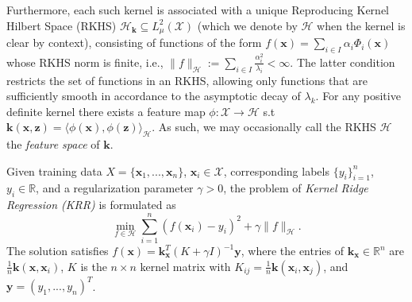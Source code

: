 \documentclass[10pt]{article} %
\theoremstyle{plain}
\theoremstyle{definition}
\theoremstyle{remark}
\newcommand{\Real}{\mathbb{R}}
\newcommand{\x}{\mathbf{x}}
\newcommand{\calx}{\mathcal{X}}
\newcommand{\z}{\mathbf{z}}
\newcommand{\y}{\mathbf{y}}
\newcommand{\kk}{\mathbf{k}}
\newcommand{\hh}{\mathcal{H}}
\newcommand{\kr}{\boldsymbol{k}}
\newcommand{\rb}[1]{\textcolor{magenta}{[Ronen: #1]}}
\begin{document}
Furthermore, each such kernel is associated with a unique Reproducing Kernel Hilbert Space (RKHS) $\hh_{\kr}\subseteq L^2_\mu (\calx)$ (which we denote by $\hh$ when the kernel is clear by context), consisting of functions of the form $f(\x)=\sum_{i \in I} \alpha_i \Phi_i(\x)$ whose RKHS norm is finite, i.e., $\|f\|_\hh:=\sum_{i \in I} \frac{\alpha_i^2}{\lambda_i}<\infty$. The latter condition restricts the set of functions in an RKHS, allowing only functions that are sufficiently smooth in accordance to the asymptotic decay of $\lambda_k$. 
For any positive definite kernel there exists a feature map $\phi:\mathcal{X}\to\hh$ s.t $\kr(\x,\z)=\langle \phi(\x),\phi(\z) \rangle_\hh$. As such, we may occasionally call the RKHS $\hh$ the \emph{feature space} of $\kr$.

Given training data $X=\{\x_1,...,\x_n\}$, $\x_i \in \calx$, corresponding labels  $\{y_i\}_{i=1}^n$, $y_i \in \Real$, and a regularization parameter $\gamma > 0$, the problem of \emph{Kernel Ridge Regression (KRR)} is formulated as
\begin{equation}  \label{eq:regression}
    \min_{f \in \hh}\sum_{i=1}^n(f(\x_i)-y_i)^2+ \gamma\|f\|_\hh.
\end{equation}
The solution satisfies $f(\x)=\kk_\x^T (K+\gamma I)^{-1}\y$, where the entries of $\kk_\x \in \Real^n$ are $\frac{1}{n}\kr(\x,\x_i)$, $K$ is the $n \times n$ kernel matrix with $K_{ij}=\frac{1}{n}\kr(\x_i,\x_j)$, and $\y=(y_1,...,y_n)^T$. 
\end{document}

